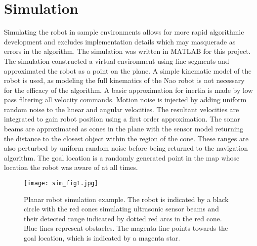 \chapter{Simulation}

Simulating the robot in sample environments allows for more rapid algorithmic development and excludes implementation details which may masquerade as errors in the algorithm. The simulation was written in MATLAB for this project. 
The simulation constructed a virtual environment using line segments and approximated the robot as a point on the plane. 
A simple kinematic model of the robot is used, as modeling the full kinematics of the Nao robot is not necessary for the efficacy of the algorithm. A basic approximation for inertia is made by low pass filtering all velocity commands. Motion noise is injected by adding uniform random noise to the linear and angular velocities. The resultant velocities are integrated to gain robot position using a first order approximation.
The sonar beams are approximated as cones in the plane with the sensor model returning the distance to the closest object within the region of the cone. These ranges are also perturbed by uniform random noise before being returned to the navigation algorithm.
The goal location is a randomly generated point in the map whose location the robot was aware of at all times.

\begin{figure}[h]
	\centering
	\texttt{[image: sim\_fig1.jpg]}
	\caption[Planar robot simulation example.]
	{Planar robot simulation example. The robot is indicated by a black circle with the red cones simulating ultrasonic sensor beams and their detected range indicated by dotted red arcs in the red cone. Blue lines represent obstacles. The magenta line points towards the goal location, which is indicated by a magenta star.}
	\label{fig:simFig1}
\end{figure}

